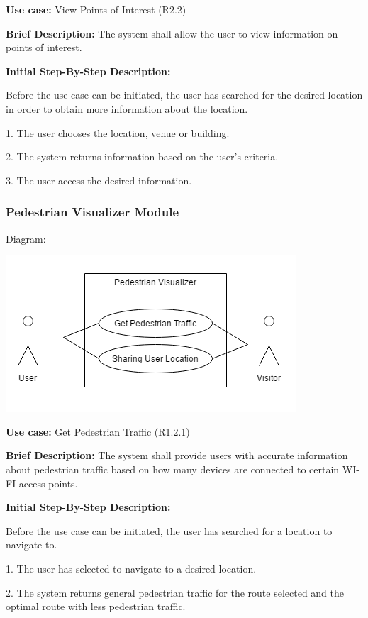 \documentclass{article}
\begin{document}
\begin{flushleft}
    \textbf{Use case:} View Points of Interest  (R2.2)
    \newline
    	
    \textbf{Brief Description:}
    \newline
    The system shall allow the user to view information on points of interest.
    \newline
    
    \textbf{Initial Step-By-Step Description:}
    
    Before the use case can be initiated, the user has searched for the desired location in order to obtain more information about the location.
	\newline    
	
1. The user chooses the location, venue or building.

2. The system returns information based on the user's criteria. 

3. The user access the desired information.

\end{flushleft}

\subsubsection{Pedestrian Visualizer Module}
    Diagram:
    
    \includegraphics[scale=.7]{PedestrianVisualizer} 

\begin{flushleft}
    \textbf{Use case:} Get Pedestrian Traffic  (R1.2.1)
    \newline
    	
    \textbf{Brief Description:}
    \newline
    The system shall provide users with accurate information about pedestrian traffic based on how many devices are connected to certain WI-FI access points.
    \newline
    
    \textbf{Initial Step-By-Step Description:}
    
    Before the use case can be initiated, the user has searched for a location to navigate to.
	\newline    
	
1. The user has selected to navigate to a desired location.

2. The system returns general pedestrian traffic for the route selected and the optimal route with less pedestrian traffic.

\end{flushleft}
\end{document}
